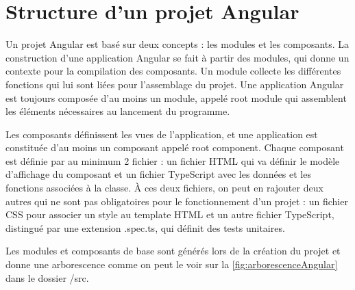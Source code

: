 \documentclass{polytech/polytech}
\begin{document}
\section{Structure d'un projet Angular}

Un projet Angular est basé sur deux concepts : les modules et les composants. La construction d’une application Angular se fait à partir des modules, qui donne un contexte pour la compilation des composants. Un module collecte les différentes fonctions qui lui sont liées pour l’assemblage du projet. Une application Angular est toujours composée d’au moins un module, appelé root module qui assemblent les éléments nécessaires au lancement du programme. 

Les composants définissent les vues de l’application, et une application est constituée d’au moins un composant appelé root component. Chaque composant est définie par au minimum 2 fichier : un fichier HTML qui va définir le modèle d’affichage du composant et un fichier TypeScript avec les données et les fonctions associées à la classe. À ces deux fichiers, on peut en rajouter deux autres qui ne sont pas obligatoires pour le fonctionnement d’un projet : un fichier CSS pour associer un style au template HTML et un autre fichier TypeScript, distingué par une extension .spec.ts, qui définit des tests unitaires.

Les modules et composants de base sont générés lors de la création du projet et donne une arborescence comme on peut le voir sur la \autoref{fig:arborescenceAngular} dans le dossier /src.
\end{document}
